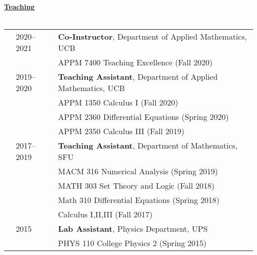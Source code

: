 \documentclass[letterpaper,11pt,oneside]{article}
\newcommand{\headr}[1]{\vspace{10pt}\uline{\Large{\textbf{#1}} \hfill } \\ \vspace{-10pt}\\}
\begin{document}
\headr{Teaching}

\vspace{-0.5cm}
\begin{tabular}{@{} p{0.01cm} @{} p{5.5cm} @{} p{12.5cm}@{} }
& 2020--2021 & \textbf{Co-Instructor}, Department of Applied Mathematics, UCB \\
&     & APPM 7400 Teaching Excellence (Fall 2020)\\ \vspace{-0.75cm}
& 2019-- 2020 & \textbf{Teaching Assistant}, Department of Applied Mathematics, UCB \\
&     & APPM 1350 Calculus I (Fall 2020)\\
&     & APPM 2360 Differential Equations (Spring 2020)\\
&     & APPM 2350 Calculus III (Fall 2019)\\
& 2017--2019  & \textbf{Teaching Assistant}, Department of Mathematics, SFU  \\
&     & MACM 316 Numerical Analysis (Spring 2019) \\
&     & MATH 303 Set Theory and Logic (Fall 2018) \\ 
&     & Math 310 Differential Equations (Spring 2018) \\ 
&     & Calculus I,II,III (Fall 2017)\\
& 2015  &\textbf{Lab Assistant}, Physics Department, UPS \\
&     & PHYS 110 College Physics 2 (Spring 2015) \\
\end{tabular}
\end{document}
